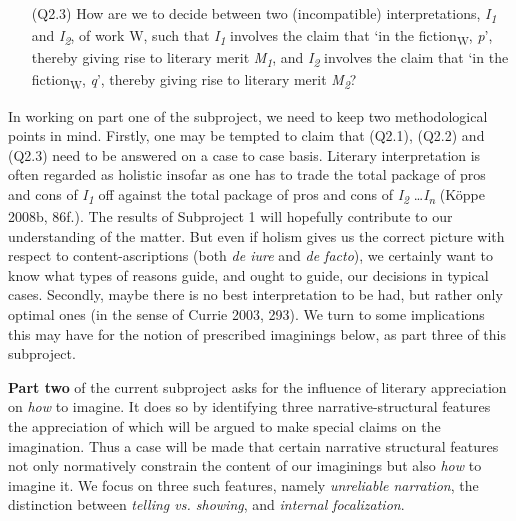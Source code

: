 \vspace{-.1cm}
\begin{itemize}[leftmargin=2cm]
\item[(Q2.3)] How are we to decide between two (incompatible) interpretations, \emph{I\textsubscript{1}} and \emph{I\textsubscript{2}}, of work W, such  that \emph{I\textsubscript{1}} involves the claim that `in the fiction\textsubscript{W}, \emph{p}', thereby giving rise to literary merit \emph{M\textsubscript{1}}, and  \emph{I\textsubscript{2}} involves the claim that `in the fiction\textsubscript{W}, \emph{q}', thereby giving rise to literary merit \emph{M\textsubscript{2}}?
\end{itemize}
\vspace{-.1cm}

\noindent In working on part one of the subproject, we need to keep two methodological points in mind. Firstly, one may be tempted to claim that (Q2.1), (Q2.2) and (Q2.3) need to be answered on a case to case basis. Literary interpretation is often regarded as holistic insofar as one has to trade the total package of pros and cons of \emph{I\textsubscript{1}} off against the total package of pros and cons of \emph{I\textsubscript{2}} \ldots \emph{I\textsubscript{n}} (K\"oppe 2008b, 86f.). The results of Subproject 1 will hopefully contribute to our understanding of the matter. But even if holism gives us the correct picture with respect to content-ascriptions (both \emph{de iure} and \emph{de facto}), we certainly want to know what types of reasons guide, and ought to guide, our decisions in typical cases. Secondly, maybe there is no best interpretation to be had, but rather only optimal ones (in the sense of Currie 2003, 293). We turn to some implications this may have for the notion of prescribed imaginings below, as part three of this subproject.

\textbf{Part two} of the current subproject asks for the influence of literary appreciation on \emph{how} to imagine. It does so by identifying three narrative-structural features the appreciation of which will be argued to make special claims on the imagination. Thus a case will be made that certain narrative structural features not only normatively constrain the content of our imaginings but also \emph{how} to imagine it. We focus on three such features, namely \emph{unreliable narration}, the distinction between \emph{telling vs. showing}, and \emph{internal focalization}.

